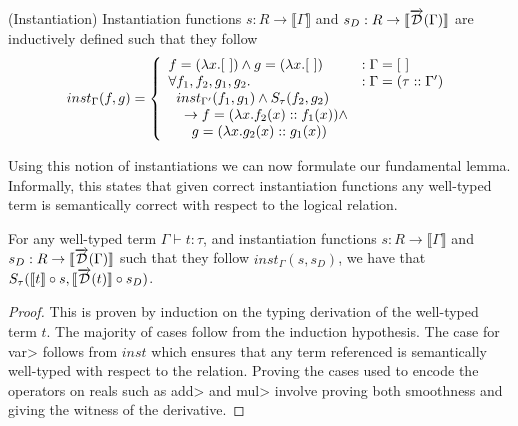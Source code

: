   \begin{definition}(Instantiation)
    Instantiation functions $s : R \rightarrow \llbracket \Gamma \rrbracket$ and $s_D : R \rightarrow \llbracket \overrightarrow{\mathcal{D}}(\Gamma) \rrbracket$ are inductively defined such that they follow
    \begin{equation}
      inst_\Gamma(f, g) =
        \left\{
          \begin{array}{ll}
            f = (\lambda x. [\ ]) \wedge g = (\lambda x. [\ ])
              & : \Gamma = [\ ] \\
            \forall f_1, f_2, g_1, g_2.
              & : \Gamma = (\tau :: \Gamma') \\
              \;\;inst_{\Gamma'}(f_1, g_1) \wedge S_\tau(f_2, g_2) \\
              \;\;\;\; \to f = (\lambda x. f_2(x) :: f_1(x)) \wedge \\
              \;\;\;\;\;\; g = (\lambda x. g_2(x) :: g_1(x))
          \end{array}
        \right.
    \label{eqn:inst_base}
    \end{equation}
  \end{definition}

  Using this notion of instantiations we can now formulate our fundamental lemma. Informally, this states that given correct instantiation functions any well-typed term is semantically correct with respect to the logical relation.

  \begin{lemma}[Fundamental]\label{thm:fundamental_lemma}
    For any well-typed term $\Gamma \vdash t : \tau$, and instantiation functions $s : R \rightarrow \llbracket \Gamma \rrbracket$ and $s_D : R \rightarrow \llbracket \overrightarrow{\mathcal{D}}(\Gamma) \rrbracket$ such that they follow $inst_\Gamma(s, s_D)$, we have that $S_\tau(\llbracket t\rrbracket \circ s, \llbracket \overrightarrow{\mathcal{D}}(t)\rrbracket \circ s_D)$.
  \end{lemma}


  \begin{proof}
    This is proven by induction on the typing derivation of the well-typed term $t$. The majority of cases follow from the induction hypothesis.
    The case for \<var> follows from $inst$ which ensures that any term referenced is semantically well-typed with respect to the relation.
    Proving the cases used to encode the operators on reals such as \<add> and \<mul> involve proving both smoothness and giving the witness of the derivative.
  \end{proof}

